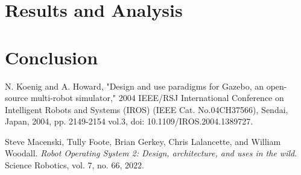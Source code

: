\documentclass[a4paper]{article}
\begin{document}
\begin{multicols}{2}
\section{Results and Analysis}
\section{Conclusion}  %

\begin{thebibliography}{99}

N. Koenig and A. Howard, "Design and use paradigms for Gazebo, an open-source 
multi-robot simulator," 2004 IEEE/RSJ International Conference on Intelligent Robots 
and Systems (IROS) (IEEE Cat. No.04CH37566), Sendai, Japan, 2004, pp. 2149-2154 vol.3, 
doi: 10.1109/IROS.2004.1389727.
  
Steve Macenski, Tully Foote, Brian Gerkey, Chris Lalancette, and William Woodall. 
\textit{Robot Operating System 2: Design, architecture, and uses in the wild}. 
Science Robotics, vol. 7, no. 66, 2022. 


\end{thebibliography}

\end{multicols}
\end{document}
